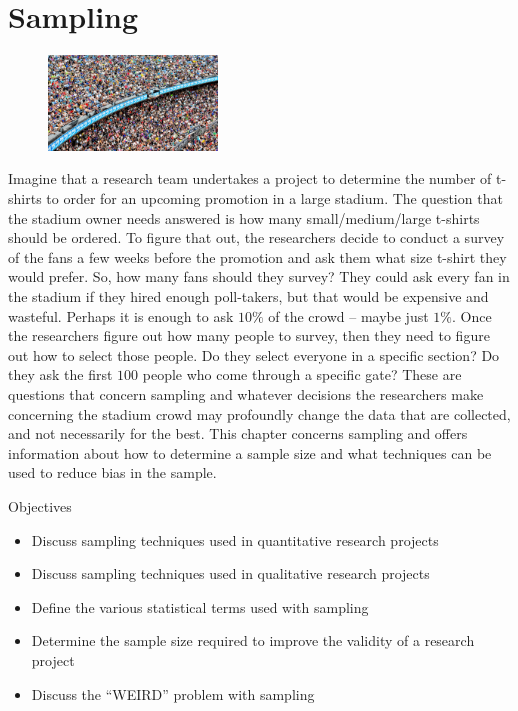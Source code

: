 \chapter{Sampling}\label{07:sampling}

\begin{figure}
	\label{07:fig01} 
	\centering
	\includegraphics[width=0.4\textwidth]{gfx/07-01} 
\end{figure}
Imagine that a research team undertakes a project to determine the number of t-shirts to order for an upcoming promotion in a large stadium. The question that the stadium owner needs answered is how many small/medium/large t-shirts should be ordered. To figure that out, the researchers decide to conduct a survey of the fans a few weeks before the promotion and ask them what size t-shirt they would prefer. So, how many fans should they survey? They could ask every fan in the stadium if they hired enough poll-takers, but that would be expensive and wasteful. Perhaps it is enough to ask $ 10\% $ of the crowd -- maybe just $ 1\% $. Once the researchers figure out how many people to survey, then they need to figure out how to select those people. Do they select everyone in a specific section? Do they ask the first $ 100 $ people who come through a specific gate? These are questions that concern sampling and whatever decisions the researchers make concerning the stadium crowd may profoundly change the data that are collected, and not necessarily for the best. This chapter concerns sampling and offers information about how to determine a sample size and what techniques can be used to reduce bias in the sample.

\begin{center}
	\begin{objbox}{Objectives}
		\begin{itemize}
			\setlength{\itemsep}{0pt}
			\setlength{\parskip}{0pt}
			\setlength{\parsep}{0pt}
			
			\item Discuss sampling techniques used in quantitative research projects
			\item Discuss sampling techniques used in qualitative research projects
			\item Define the various statistical terms used with sampling
			\item Determine the sample size required to improve the validity of a research project
			\item Discuss the ``WEIRD'' problem with sampling
		\end{itemize}
	\end{objbox}
\end{center}

